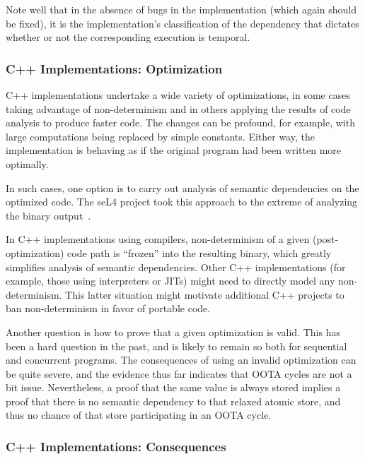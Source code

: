 \documentclass[10]{article}
\begin{document}
Note well that in the absence of bugs in the implementation (which
again should be fixed), it is the implementation's classification of
the dependency that dictates whether or not the corresponding execution
is temporal.

\subsubsection{C++ Implementations: Optimization}
\label{sec:C++ Implementations: Optimization}

C++ implementations undertake a wide variety of optimizations, in
some cases taking advantage of non-determinism and in others applying
the results of code analysis to produce faster code.
The changes can be profound, for example, with large computations being
replaced by simple constants.
Either way, the implementation is behaving as if the original program
had been written more optimally.

In such cases, one option is to carry out analysis of semantic dependencies
on the optimized code.
The seL4 project took this approach to the extreme of analyzing
the binary output~\cite{ThomasSewell2013L4binaryVerification}.

In C++ implementations using compilers, non-determinism of a given
(post-optimization) code path is ``frozen'' into the resulting binary,
which greatly simplifies analysis of semantic dependencies.
Other C++ implementations (for example, those using interpreters or JITs)
might need to directly model any non-determinism.
This latter situation might motivate additional C++ projects to ban
non-determinism in favor of portable code.

Another question is how to prove that a given optimization is valid.
This has been a hard question in the past, and is likely to remain so
both for sequential and concurrent programs.
The consequences of using an invalid optimization can be quite severe,
and the evidence thus far indicates that OOTA cycles are not a bit issue.
Nevertheless, a proof that the same value is always stored implies a
proof that there is no semantic dependency to that relaxed atomic store,
and thus no chance of that store participating in an OOTA cycle.

\subsubsection{C++ Implementations: Consequences}
\label{sec:C++ Implementations: Consequences}
\end{document}
